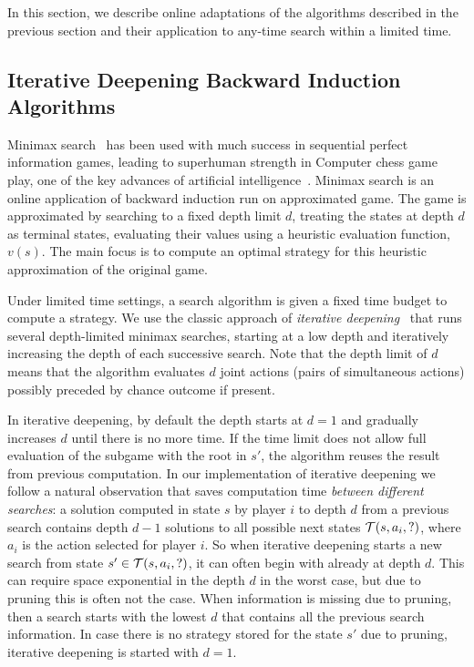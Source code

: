 
In this section, we describe online adaptations of the algorithms described in the previous section and their application
to any-time search within a limited time.

\subsection{Iterative Deepening Backward Induction Algorithms} \label{sec:idbi}

Minimax search~\cite{AIbook} has been used with much success in sequential perfect information games,
leading to superhuman strength in Computer chess game play, one of the key advances of artificial
intelligence~\cite{Campbell02deepblue}.
Minimax search is an online application of backward induction run on approximated game.
The game is approximated by searching to a fixed depth limit $d$, treating the states at depth $d$
as terminal states, evaluating their values using a heuristic evaluation function, $v(s)$.
The main focus is to compute an optimal strategy for this heuristic approximation of the original game.

Under limited time settings, a search algorithm is given a fixed time budget to compute a strategy.
We use the classic approach of {\it iterative deepening}~\cite{AIbook} that runs several depth-limited
minimax searches, starting at a low depth and iteratively increasing the depth of each successive search.
Note that the depth limit of $d$ means that the algorithm evaluates $d$ joint actions (\ie pairs of simultaneous actions) possibly preceded by chance outcome if present.

In iterative deepening, by default the depth starts at $d = 1$ and gradually increases $d$ until there is no more time.
If the time limit does not allow full evaluation of the subgame with the root in $s'$, the algorithm reuses the result from previous computation.
In our implementation of iterative deepening we follow a natural observation that saves computation time {\it between different searches}: 
a solution computed in state $s$ by player $i$ to depth $d$ from a previous search contains depth $d-1$ solutions to all possible 
next states $\mathcal{T}(s,a_i,?)$, where $a_i$ is the action selected for player $i$.
So when iterative deepening starts a new search from state $s' \in \mathcal{T}(s,a_i,?)$, it can often begin with already at depth $d$.
This can require space exponential in the depth $d$ in the worst case, but due to pruning this is often not the case.
When information is missing due to pruning, then a search starts with the lowest $d$ that contains all the previous search information.
In case there is no strategy stored for the state $s'$ due to pruning, iterative deepening is started with $d = 1$.

